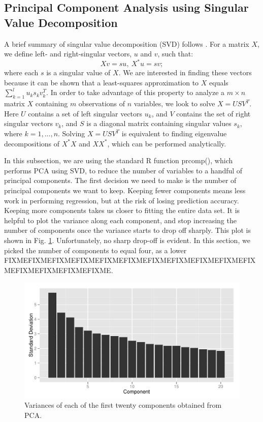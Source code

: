 \subsection{Principal Component Analysis using Singular Value Decomposition}
A brief summary of singular value decomposition (SVD) follows \cite{berrar}. For a matrix $X$, we define left- and right-singular vectors, $u$ and $v$, such that:
\begin{equation}
Xv=su,~X^*u = sv;
\end{equation}
where each $s$ is a singular value of $X$. We are interested in finding these vectors because it can be shown that a least-squares approximation to $X$ equals $\sum_{k=1}^{l}u_ks_kv_k^T$. In order to take advantage of this property to analyze a $m\times n$ matrix $X$ containing $m$ observations of $n$ variables, we look to solve $X = USV^T$. Here $U$ contains a set of left singular vectors $u_k$, and $V$ contains the set of right singular vectors $v_k$, and $S$ is a diagonal matrix containing singular values $s_k$, where $k = 1, ..., n$. Solving $X = USV^T$ is equivalent to finding eigenvalue decompositions of $X^*X$ and $XX^*$, which can be performed analytically. 

In this subsection, we are using the standard R function prcomp(), which performs PCA using SVD, to reduce the number of variables to a handful of principal components. The first decision we need to make is the number of principal components we want to keep. Keeping fewer components means less work in performing regression, but at the risk of losing prediction accuracy. Keeping more components takes us closer to fitting the entire data set. It is helpful to plot the variance along each component, and stop increasing the number of components once the variance starts to drop off sharply. This plot is shown in Fig. \ref{components}. Unfortunately, no sharp drop-off is evident. In this section, we picked the number of components to equal four, as a lower FIXMEFIXMEFIXMEFIXMEFIXMEFIXMEFIXMEFIXMEFIXMEFIXMEFIXMEFIXMEFIXMEFIXMEFIXME.

\begin{figure}
\centering
\includegraphics[scale=0.65]{components.pdf}
\caption{Variances of each of the first twenty components obtained from PCA.}
\label{components}
\end{figure}


